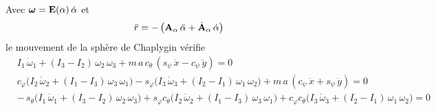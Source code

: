 \begin{theoreme}
    Avec $\bm{\omega} = \mathbf{E}(\alpha)\,\dot\alpha$ et
    \[
        \ddot r = -\,\bigl(\mathbf{A}_\alpha\,\ddot\alpha
        + \dot{\mathbf{A}}_\alpha\,\dot\alpha\bigr)
    \]
    le mouvement de la sphère de Chaplygin vérifie
    \begin{align*}
        &I_1\,\dot\omega_1 + (I_3 - I_2)\,\omega_2\,\omega_3
            + m\,a\,c_\theta\,(s_\psi\,\ddot x - c_\psi\,\ddot y) = 0\\
        &c_\varphi\bigl(I_2\,\dot\omega_2 + (I_1 - I_3)\,\omega_3\,
            \omega_1\bigr)
            - s_\varphi\bigl(I_3\,\dot\omega_3 + (I_2 - I_1)\,
            \omega_1\,\omega_2\bigr)
            + m\,a\,(c_\psi\,\ddot x + s_\psi\,\ddot y) = 0\\
        &-\,s_\theta\bigl(I_1\,\dot\omega_1 + (I_3 - I_2)\,\omega_2\,
            \omega_3\bigr)
            + s_\varphi c_\theta\bigl(I_2\,\dot\omega_2
            + (I_1 - I_3)\,\omega_3\,\omega_1\bigr)
            + c_\varphi c_\theta\bigl(I_3\,\dot\omega_3
            + (I_2 - I_1)\,\omega_1\,\omega_2\bigr) = 0
    \end{align*}
\end{theoreme}